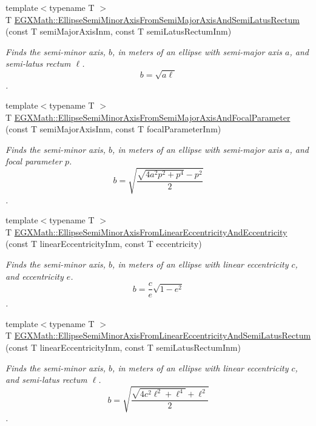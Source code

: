 \begin{DoxyCompactItemize}
{\footnotesize template$<$typename T $>$ }\\T \mbox{\hyperlink{group___e_g_x_math-_geometry-2_d-_ellipse-_semi_minor_axis_gaed84cd29b0768dd8eb2628b69e5c163f}{E\+G\+X\+Math\+::\+Ellipse\+Semi\+Minor\+Axis\+From\+Semi\+Major\+Axis\+And\+Semi\+Latus\+Rectum}} (const T semi\+Major\+Axis\+Inm, const T semi\+Latus\+Rectum\+Inm)
\begin{DoxyCompactList}\small\item\em Finds the semi-\/minor axis, $b$, in meters of an ellipse with semi-\/major axis $a$, and semi-\/latus rectum $\ell$. \[ b= \sqrt{a\ell} \]. \end{DoxyCompactList}\item 
{\footnotesize template$<$typename T $>$ }\\T \mbox{\hyperlink{group___e_g_x_math-_geometry-2_d-_ellipse-_semi_minor_axis_ga49cd1c9a110ae740e606d1f012edf037}{E\+G\+X\+Math\+::\+Ellipse\+Semi\+Minor\+Axis\+From\+Semi\+Major\+Axis\+And\+Focal\+Parameter}} (const T semi\+Major\+Axis\+Inm, const T focal\+Parameter\+Inm)
\begin{DoxyCompactList}\small\item\em Finds the semi-\/minor axis, $b$, in meters of an ellipse with semi-\/major axis $a$, and focal parameter $p$. \[ b=\sqrt{\dfrac{\sqrt{4 a^2 p^2 + p^4}-p^2}{2}} \]. \end{DoxyCompactList}\item 
{\footnotesize template$<$typename T $>$ }\\T \mbox{\hyperlink{group___e_g_x_math-_geometry-2_d-_ellipse-_semi_minor_axis_ga7d19bfb56b8d9678c8ff7c843e1ae3b6}{E\+G\+X\+Math\+::\+Ellipse\+Semi\+Minor\+Axis\+From\+Linear\+Eccentricity\+And\+Eccentricity}} (const T linear\+Eccentricity\+Inm, const T eccentricity)
\begin{DoxyCompactList}\small\item\em Finds the semi-\/minor axis, $b$, in meters of an ellipse with linear eccentricity $c$, and eccentricity $e$. \[ b=\dfrac{c}{e}\sqrt{1 - e^2}\]. \end{DoxyCompactList}\item 
{\footnotesize template$<$typename T $>$ }\\T \mbox{\hyperlink{group___e_g_x_math-_geometry-2_d-_ellipse-_semi_minor_axis_gac4b0e45f43bee20fc64bbdd421ebc956}{E\+G\+X\+Math\+::\+Ellipse\+Semi\+Minor\+Axis\+From\+Linear\+Eccentricity\+And\+Semi\+Latus\+Rectum}} (const T linear\+Eccentricity\+Inm, const T semi\+Latus\+Rectum\+Inm)
\begin{DoxyCompactList}\small\item\em Finds the semi-\/minor axis, $b$, in meters of an ellipse with linear eccentricity $c$, and semi-\/latus rectum $\ell$. \[ b=\sqrt{\dfrac{\sqrt{4 c^2 \ell^2+ \ell^4}+\ell^2}{2}}\]. \end{DoxyCompactList}\item 

\end{DoxyCompactItemize}
